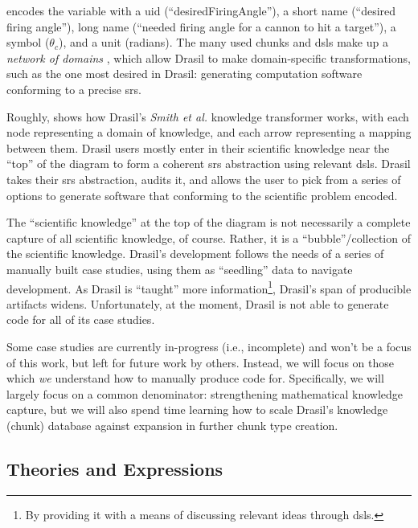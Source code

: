 \exampleAngleVariableEncoding{}

 encodes the variable with a \acs{uid}
(``desiredFiringAngle''), a short name (``desired firing angle''), long name
(``needed firing angle for a cannon to hit a target''), a symbol
(\(\theta{}_{c}\)), and a unit (radians). The many used chunks and \acsp{dsl}
make up a \textit{network of domains} \cite{Czarnecki2005}, which allow Drasil
to make domain-specific transformations, such as the one most desired in Drasil:
generating computation software conforming to a precise \acs{srs}.

\roughNetworkOfDomainsIntro{}

Roughly,  shows how Drasil's \textit{Smith et
      al.} knowledge transformer works, with each node representing a domain of
knowledge, and each arrow representing a mapping between them. Drasil users
mostly enter in their scientific knowledge near the ``top'' of the diagram to
form a coherent \acs{srs} abstraction using relevant \acsp{dsl}. Drasil takes
their \acs{srs} abstraction, audits it, and allows the user to pick from a
series of options to generate software that conforming to the scientific problem
encoded.

The ``scientific knowledge'' at the top of the diagram is not necessarily a
complete capture of all scientific knowledge, of course. Rather, it is a
``bubble''/collection of the scientific knowledge. Drasil's development follows
the needs of a series of manually built case studies, using them as ``seedling''
data to navigate development. As Drasil is ``taught'' more
information\footnote{By providing it with a means of discussing relevant ideas
      through \acsp{dsl}.}, Drasil's span of producible artifacts widens.
Unfortunately, at the moment, Drasil is not able to generate code for all of its
case studies.

Some case studies are currently in-progress (i.e., incomplete) and won't be a
focus of this work, but left for future work by others. Instead, we will focus
on those which \textit{we} understand how to manually produce code for.
Specifically, we will largely focus on a common denominator: strengthening
mathematical knowledge capture, but we will also spend time learning how to
scale Drasil's knowledge (chunk) database against expansion in further chunk
type creation.

\subsection{Theories and Expressions}
\label{chap:intro:sec:drasil:subsec:theories-and-expressions}

